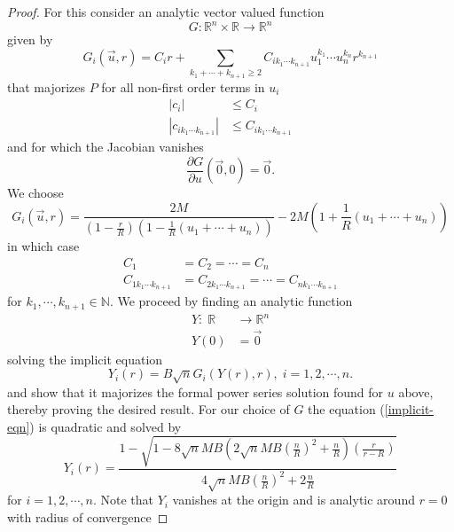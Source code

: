 \documentclass{amsart}
\theoremstyle{definition}
\theoremstyle{remark}
\numberwithin{equation}{section}
\newcommand{\R}{\mathbb{R}}  %
\newcommand{\N}{\mathbb{N}}
\begin{document}
\begin{proof}
For this consider an analytic vector valued function 
\begin{equation*}
G: \R^n \times \R \rightarrow \R^n
\end{equation*}
given by
\begin{equation*}
G_i(\vec{u},r) = C_i r + \sum_{k_1 + \cdots + k_{n+1} \geq 2} C_{i k_1 \cdots k_{n+1}} u_1^{k_1} \cdots u_n^{k_n} r^{k_{n+1}}
\end{equation*}
that majorizes $P$ for all non-first order terms in $u_i$
\begin{align*}
|c_i| &\leq C_i  \\
|c_{i k_1 \cdots k_{n+1}}| &\leq  C_{i k_1 \cdots k_{n+1}}
\end{align*}
and for which the Jacobian vanishes
\begin{equation*}
\frac{\partial G}{\partial u} (\vec{0},0) = \vec{0}.
\end{equation*}
We choose
\begin{equation*}
G_i(\vec{u},r) = \frac{2M}{\left(1- \frac{r}{R} \right)\left( 1 - \frac{1}{R}\left( u_1 + \cdots + u_n \right) \right)} - 2M \left( 1 + \frac{1}{R}\left( u_1 + \cdots + u_n \right) \right)
\end{equation*}
in which case
\begin{align*}
C_1 &= C_2 = \cdots = C_n \\
C_{1 k_1 \cdots k_{n+1}} &= C_{2 k_1 \cdots k_{n+1}} = \cdots = C_{n k_1 \cdots k_{n+1}}
\end{align*}
for $k_1, \cdots, k_{n+1} \in \N$. We proceed by finding an analytic function
\begin{align*}
Y:\; \R &\longrightarrow \R^n \\
Y(0)&= \vec{0}
\end{align*} 
solving the implicit equation 
\begin{equation}
\label{implicit-eqn}
Y_i(r) =  B\sqrt{n} G_i( Y(r), r), \; i = 1, 2, \cdots, n.
\end{equation}
and show that it majorizes the formal power series solution found for $u$ above, thereby proving the desired result. For our choice of $G$ the equation (\ref{implicit-eqn}) is quadratic and solved by
\begin{equation*}
Y_i(r) = \frac{1 - \sqrt{ 1 - 8\sqrt{n}MB \left( 2\sqrt{n}MB\left(\frac{n}{R}\right)^2 + \frac{n}{R} \right)\left(\frac{r}{r-R}\right)  } }{4\sqrt{n}MB\left(\frac{n}{R}\right)^2 + 2\frac{n}{R}}
\end{equation*}
for $i = 1, 2, \cdots, n$. Note that $Y_i$ vanishes at the origin and is analytic around $r =0$ with radius of convergence

\end{proof}
\end{document}
